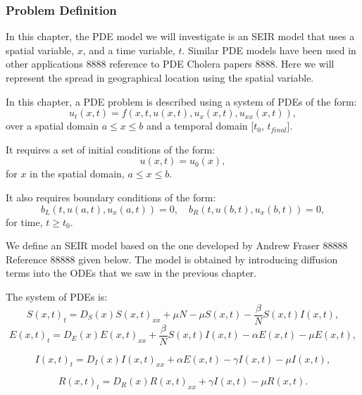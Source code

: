 \documentclass{article}
\begin{document}
\subsubsection{Problem Definition}
\label{subsection:pde_problem_def}
In this chapter, the PDE model we will investigate is an SEIR model that uses a spatial variable, $x$, and a time variable, $t$. Similar PDE models have been used in other applications 8888 reference to PDE Cholera papers 8888. Here we will represent the spread in geographical location using the spatial variable.

In this chapter, a PDE problem is described using a system of PDEs of the form:
\begin{equation}
u_t(x, t) = f(x, t, u(x,t), u_x(x,t), u_{xx}(x,t)),
\end{equation} 
over a spatial domain ${a \leq x \leq b}$ and a temporal domain [${t_0}$, $t_{final}$]. 

It requires a set of initial conditions of the form:
\begin{equation}
u(x, t) = u_0(x),
\end{equation}
for $x$ in the spatial domain, ${a \leq x \leq b}$.

It also requires boundary conditions of the form:
\begin{equation}
b_L(t, u(a,t), u_x(a,t)) = 0, \quad b_R(t, u(b,t), u_x(b,t)) = 0,
\end{equation} 
for time, $t \geq t_0$.

We define an SEIR model based on the one developed by Andrew Fraser 88888 Reference 88888 given below. The model is obtained by introducing diffusion terms into the ODEs that we saw in the previous chapter.

The system of PDEs is:
\begin{equation}
S(x, t)_t = D_S(x)S(x, t)_{xx} + \mu N - \mu S(x, t) - \frac{\beta}{N}S(x, t)I(x, t),
\end{equation}
\begin{equation}
E(x, t)_t = D_E(x)E(x, t)_{xx} + \frac{\beta}{N}S(x, t)I(x, t) - \alpha E(x, t) - \mu E(x, t),
\end{equation}

\begin{equation}
I(x, t)_t = D_I(x)I(x, t)_{xx} + \alpha E(x, t) - \gamma I(x, t) - \mu I(x, t),
\end{equation}

\begin{equation}
R(x, t)_t = D_R(x)R(x, t)_{xx} + \gamma I(x, t) - \mu R(x, t).
\end{equation} 
\end{document}
